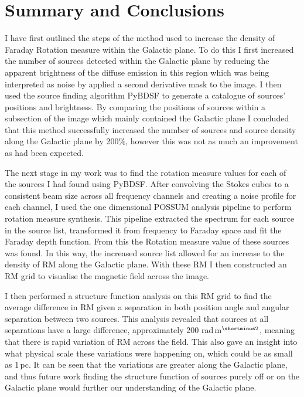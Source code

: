 \chapter{Summary and Conclusions}
\label{ch: Conclusion}

I have first outlined the steps of the method used to increase the density of Faraday Rotation measure within the Galactic plane. To do this I first increased the number of sources detected within the Galactic plane by reducing the apparent brightness of the diffuse emission in this region which was being interpreted as noise by applied a second derivative mask to the image. I then used the source finding algorithm PyBDSF to generate a catalogue of sources' positions and brightness. By comparing the positions of sources within a subsection of the image which mainly contained the Galactic plane I concluded that this method successfully increased the number of sources and source density along the Galactic plane by 200$\%$, however this was not as much an improvement as had been expected. 

The next stage in my work was to find the rotation measure values for each of the sources I had found using PyBDSF. After convolving the Stokes cubes to a consistent beam size across all frequency channels and creating a noise profile for each channel, I used the one dimensional POSSUM analysis pipeline to perform rotation measure synthesis. This pipeline extracted the spectrum for each source in the source list, transformed it from frequency to Faraday space and fit the Faraday depth function. From this the Rotation measure value of these sources was found. In this way, the increased source list allowed for an increase to the density of RM along the Galactic plane. With these RM I then constructed an RM grid to visualise the magnetic field across the image. 

I then performed a structure function analysis on this RM grid to find the average difference in RM given a separation in both position angle and angular separation between two sources. This analysis revealed that sources at all separations have a large difference, approximately 200 rad$\,$m$^{\shortminus2}$, meaning that there is rapid variation of RM across the field. This also gave an insight into what physical scale these variations were happening on, which could be as small as 1$\,$pc. It can be seen that the variations are greater along the Galactic plane, and thus future work finding the structure function of sources purely off or on the Galactic plane would further our understanding of the Galactic plane.

